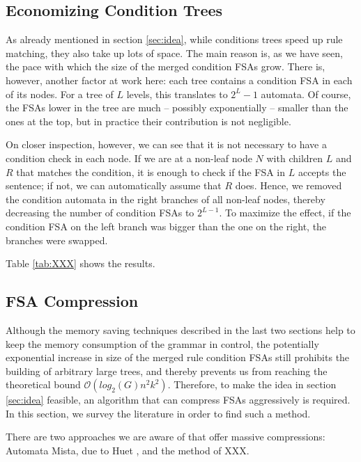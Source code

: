 \documentclass{article}
\begin{document}
\subsection{Economizing Condition Trees}

As already mentioned in section \ref{sec:idea}, while conditions trees speed up
rule matching, they also take up lots of space. The main reason is, as we have
seen, the pace with which the size of the merged condition FSAs grow. There is,
however, another factor at work here: each tree contains a condition FSA in each
of its nodes. For a tree of $L$ levels, this translates to $2^L - 1$ automata.
Of course, the FSAs lower in the tree are much -- possibly exponentially --
smaller than the ones at the top, but in practice their contribution is not
negligible.

On closer inspection, however, we can see that it is not necessary to have a
condition check in each node. If we are at a non-leaf node $N$ with children
$L$ and $R$ that matches the condition, it is enough to check if the FSA in
$L$ accepts the sentence; if not, we can automatically assume that $R$ does.
Hence, we removed the condition automata in the right branches of all non-leaf
nodes, thereby decreasing the number of condition FSAs to $2^{L-1}$. To maximize
the effect, if the condition FSA on the left branch was bigger than the one on
the right, the branches were swapped.

Table \ref{tab:XXX} shows the results.

\subsection{FSA Compression}

Although the memory saving techniques described in the last two sections help to
keep the memory consumption of the grammar in control, the potentially
exponential increase in size of the merged rule condition FSAs still prohibits
the building of arbitrary large trees, and thereby prevents us from reaching
the theoretical bound $\mathcal{O}(log_2(G)n^2k^2)$. Therefore, to make the idea
in section \ref{sec:idea} feasible, an algorithm that can compress FSAs
aggressively is required. %
In this section, we survey the literature in order to find such a method.

There are two approaches we are aware of that offer massive compressions:
Automata Mista, due to Huet , and the method of
XXX.
\end{document}
